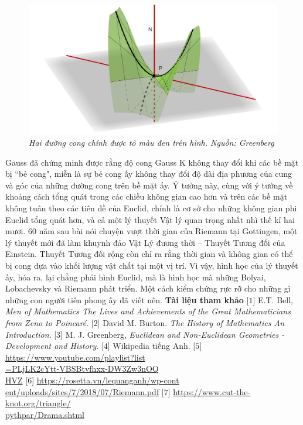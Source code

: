 \begin{multicols}{2}
\begin{figure}[H]
		\centering
		\captionsetup{labelformat= empty, justification=centering}
		\includegraphics[width= 1\linewidth]{saddle point and riemann curvature.png}
		\caption{\small\textit{\color{lichsutoanhoc}Hai đường cong chính được tô màu đen trên hình. Nguồn: Greenberg}}
		\vspace*{-10pt}
	\end{figure}
	Gauss đã chứng minh được rằng độ cong Gauss K không thay đổi khi các bề mặt bị ``bẻ cong", miễn là sự bẻ cong ấy không thay đổi độ dài địa phương của cung và góc của những đường cong trên bề mặt ấy. 
	\vskip 0.1cm
	Ý tưởng này, cùng với ý tưởng về khoảng cách tổng quát trong các chiều không gian cao hơn và trên các bề mặt không tuân theo các tiên đề của Euclid, chính là cơ sở cho những không gian phi Euclid tổng quát hơn, và cả một lý thuyết Vật lý quan trọng nhất nhì thế kỉ hai mươi.
	\vskip 0.1cm
	$60$ năm sau bài nói chuyện vượt thời gian của Riemann tại Gottingen, một lý thuyết mới đã làm khuynh đảo Vật Lý đương thời -- Thuyết Tương đối của Einstein. Thuyết Tương đối rộng còn chỉ ra rằng thời gian và không gian có thể bị cong dựa vào khối lượng vật chất tại một vị trí. Vì vậy, hình học của lý thuyết ấy, hóa ra, lại chẳng phải hình Euclid, mà là hình học mà những Bolyai, Lobachevsky và Riemann phát triển. Một cách kiểm chứng rực rỡ cho những gì những con người tiên phong ấy đã viết nên.
	\vskip 0.1cm
	\textbf{\color{lichsutoanhoc}Tài liệu tham khảo}
	\vskip 0.1cm
	[$1$] E.T.  Bell, \textit{Men of Mathematics The Lives and Achievements of the Great Mathematicians from Zeno to Poincaré}.   
	\vskip 0.1cm
	[$2$] David M. Burton. \textit{The History of Mathematics An Introduction}. 
	\vskip 0.1cm
	[$3$] M. J. Greenberg, \textit{Euclidean and Non-Euclidean Geometries - Development and History}. 
	\vskip 0.1cm
	[$4$] Wikipedia tiếng Anh.
	\vskip 0.1cm
	[$5$] \url{https://www.youtube.com/playlist?list}\\
	\url{=PLjLK2cYtt-VBSBtvfhxx-DW3Zw3nOQ}\\ \url{HVZ}
	\vskip 0.1cm
	[$6$] \url{https://rosetta.vn/lequanganh/wp-cont} \url{ent/uploads/sites/7/2018/07/Riemann.pdf}
	\vskip 0.1cm
	[$7$] \url{https://www.cut-the-knot.org/triangle/}\\
	\url{pythpar/Drama.shtml}
\end{multicols}